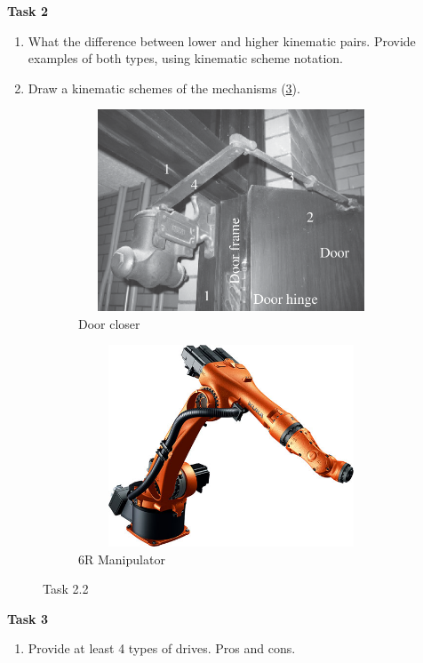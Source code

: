 \documentclass[12pt]{article}
\newcommand\pic[1]{(\cref{#1})} %
\begin{document}
\textbf{Task 2}
\begin{enumerate}
    \item What the difference between lower and higher kinematic pairs. Provide examples of both types, using kinematic scheme notation.
    \item Draw a kinematic schemes of the mechanisms \pic{fig:resources_quiz_1/quiz1_task2.png}.
\end{enumerate}
\begin{figure}[H]
    \begin{subfigure}{0.49\textwidth}
        \centering\includegraphics[height=6cm,width=1\textwidth,keepaspectratio]{quiz1_task2.png}
        \caption{Door closer}
        \label{fig:file_name1}
    \end{subfigure}
    \begin{subfigure}{0.49\textwidth}
        \centering\includegraphics[height=6cm,width=1\textwidth,keepaspectratio]{kc_2.png}
        \caption{6R Manipulator}
        \label{fig:file_name2}
    \end{subfigure}

\caption{Task 2.2}
\label{fig:resources_quiz_1/quiz1_task2.png}
\end{figure}


\textbf{Task 3}
\begin{enumerate}
    \item Provide at least 4 types of drives. Pros and cons.
\end{enumerate}
\end{document}

